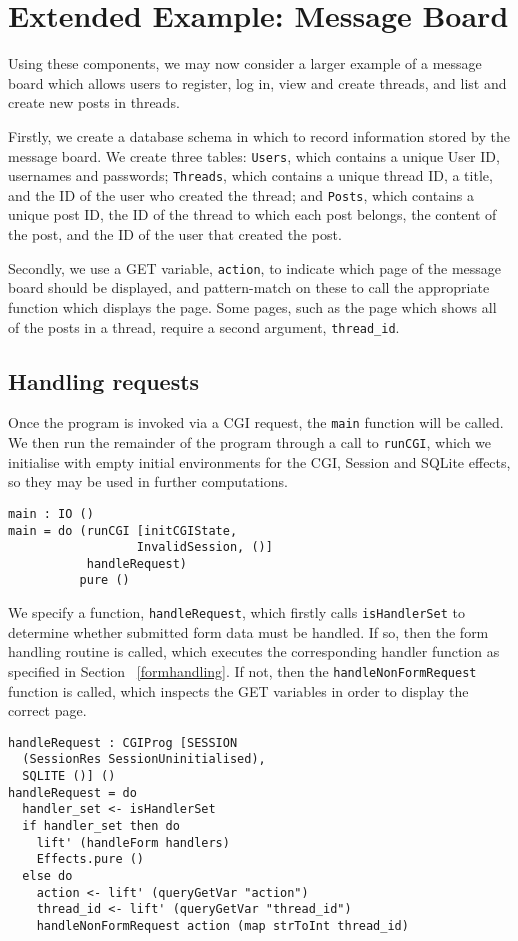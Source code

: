 \documentclass[preprint]{sigplanconf}
\begin{document}

\section{Extended Example: Message Board}
\label{messageboard}
Using these components, we may now consider a larger example of a message board which allows users to register, log in, view and create threads, and list and create new posts in threads. 

Firstly, we create a database schema in which to record information stored by the message board. We create three tables: \texttt{Users}, which contains a unique User ID, usernames and passwords; \texttt{Threads}, which contains a unique thread ID, a title, and the ID of the user who created the thread; and \texttt{Posts}, which contains a unique post ID, the ID of the thread to which each post belongs, the content of the post, and the ID of the user that created the post.

Secondly, we use a GET variable, \texttt{action}, to indicate which page of the message board should be displayed, and pattern-match on these to call the appropriate function which displays the page. Some pages, such as the page which shows all of the posts in a thread, require a second argument, \texttt{thread\_id}. 
\subsection{Handling requests}
Once the program is invoked via a CGI request, the \texttt{main} function will be called. We then run the remainder of the program through a call to \texttt{runCGI}, which we initialise with empty initial environments for the CGI, Session and SQLite effects, so they may be used in further computations. 

{\small
\begin{verbatim}
main : IO ()
main = do (runCGI [initCGIState, 
                  InvalidSession, ()] 
           handleRequest)
          pure ()
\end{verbatim}
}
We specify a function, \texttt{handleRequest}, which firstly calls \texttt{isHandlerSet} to determine whether submitted form data must be handled. If so, then the form handling routine is called, which executes the corresponding handler function as specified in Section ~\ref{formhandling}. If not, then the \texttt{handleNonFormRequest} function is called, which inspects the GET variables in order to display the correct page.
{\small
\begin{verbatim}
handleRequest : CGIProg [SESSION 
  (SessionRes SessionUninitialised), 
  SQLITE ()] ()
handleRequest = do 
  handler_set <- isHandlerSet
  if handler_set then do
    lift' (handleForm handlers)
    Effects.pure ()
  else do
    action <- lift' (queryGetVar "action")
    thread_id <- lift' (queryGetVar "thread_id")
    handleNonFormRequest action (map strToInt thread_id)
\end{verbatim}
}
\end{document}
